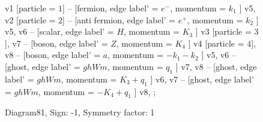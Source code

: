 \documentclass{revtex4}
\begin{document}
\begin{figure}[!htb]
\begin{center}
{    %
v1 [particle = \(1\)] -- [fermion, edge label' = \(e^{-}\), momentum = \(k_{1}\) ] v5, 
v2 [particle = \(2\)] -- [anti fermion, edge label' = \(e^{+}\), momentum = \(k_{2}\) ] v5, 
v6 -- [scalar, edge label' = \(H\), momentum = \(K_{3}\) ] v3 [particle = \(3\)], 
v7 -- [boson, edge label' = \(Z\), momentum = \(K_{4}\) ] v4 [particle = \(4\)], 
v8 -- [boson, edge label' = \(a\), momentum = \(-k_{1} - k_{2}\) ] v5, 
v6 -- [ghost, edge label' = \(ghWm\), momentum = \(q_{1}\) ] v7, 
v8 -- [ghost, edge label' = \(ghWm\), momentum = \(K_{3} + q_{1}\) ] v6, 
v7 -- [ghost, edge label' = \(ghWm\), momentum = \(-K_{4} + q_{1}\) ] v8, 
};
\end{center}
\caption{Diagram81, Sign: -1, Symmetry factor: 1}
\end{figure}
\newpage
\end{document}

